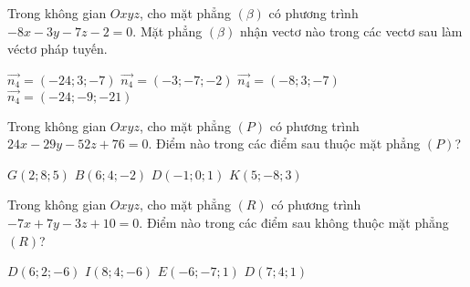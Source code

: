 \documentclass[12pt,a4paper]{article}
\begin{document}
\begin{ex}
 Trong không gian ${Oxyz}$, cho mặt phẳng ${(\beta)}$ có phương trình $- 8 x - 3 y - 7 z - 2=0$. Mặt phẳng ${(\beta)}$ nhận vectơ nào trong các vectơ sau làm véctơ pháp tuyến.
 
\choice
{ $\overrightarrow{n_4}=(-24;3;-7)$ }
   { $\overrightarrow{n_4}=(-3;-7;-2)$ }
     { $\overrightarrow{n_4}=(-8;3;-7)$ }
    { \True $\overrightarrow{n_4}=(-24;-9;-21)$ }
\end{ex}

\begin{ex}
 Trong không gian ${Oxyz}$, cho mặt phẳng ${(P)}$ có phương trình $24 x - 29 y - 52 z + 76=0$. Điểm nào trong các điểm sau thuộc mặt phẳng ${(P)}$?
 
\choice
{ $G(2;8;5)$ }
   { $B(6;4;-2)$ }
     { \True $D(-1;0;1)$ }
    { $K(5;-8;3)$ }
\end{ex}

\begin{ex}
 Trong không gian ${Oxyz}$, cho mặt phẳng ${(R)}$ có phương trình $- 7 x + 7 y - 3 z + 10=0$. Điểm nào trong các điểm sau không thuộc mặt phẳng ${(R)}$?
 
\choice
{ $D(6;2;-6)$ }
   { $I(8;4;-6)$ }
     { $E(-6;-7;1)$ }
    { \True $D(7;4;1)$ }
\end{ex}
\end{document}
